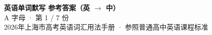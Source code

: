 \documentclass[10pt,a4paper]{article}
\begin{document}
\pagestyle{plain}

\begin{center}
{\LARGE\bfseries 英语单词默写 \quad 参考答案（英 $\to$ 中）}\\[0.22em]
{\large A 字母 · 第 1 / 7 份}\\[0.18em]
{\small 2026年上海市高考英语词汇用法手册 · 参照普通高中英语课程标准}
\end{center}

\vspace{0.2em}
\noindent{\color{rulegray}\rule{\textwidth}{0.8pt}}

\vspace{0.35em}

\vspace{0.25em}
\renewcommand{\arraystretch}{1.32}
\end{document}
